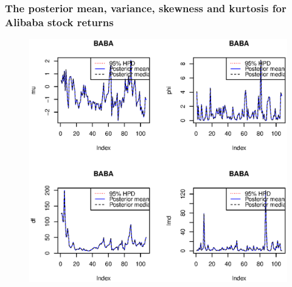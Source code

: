\documentclass{beamer}
\begin{document}
\begin{frame}
  \frametitle{The posterior mean, variance, skewness and kurtosis for Alibaba stock returns}
  \begin{figure}
    \centering
     \includegraphics[height=0.9\textheight]{plot/BABAStocks}\\

  \end{figure}
\end{frame}
\end{document}
